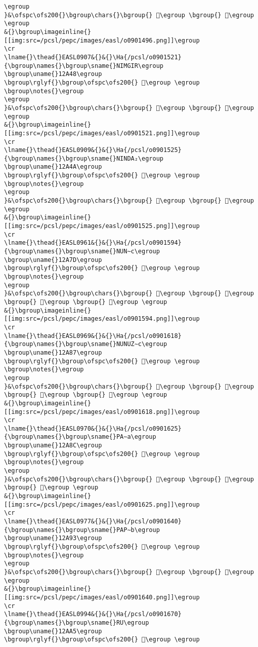\begin{verbatim}
\egroup
}&\ofspc\ofs200{}\bgroup\chars{}\bgroup{} 𒨷\egroup \bgroup{} 𒨹\egroup \egroup
&{}\bgroup\imageinline{}[[img:src=/pcsl/pepc/images/easl/o0901496.png]]\egroup
\cr
\lname{}\thead{}EASL0907&{}&{}\Ha{/pcsl/o0901521}{\bgroup\names{}\bgroup\sname{}NIMGIR\egroup
\bgroup\uname{}12A48\egroup
\bgroup\rglyf{}\bgroup\ofspc\ofs200{} 𒩈\egroup \egroup
\bgroup\notes{}\egroup
\egroup
}&\ofspc\ofs200{}\bgroup\chars{}\bgroup{} 𒩇\egroup \bgroup{} 𒩈\egroup \egroup
&{}\bgroup\imageinline{}[[img:src=/pcsl/pepc/images/easl/o0901521.png]]\egroup
\cr
\lname{}\thead{}EASL0909&{}&{}\Ha{/pcsl/o0901525}{\bgroup\names{}\bgroup\sname{}NINDA₂\egroup
\bgroup\uname{}12A4A\egroup
\bgroup\rglyf{}\bgroup\ofspc\ofs200{} 𒩊\egroup \egroup
\bgroup\notes{}\egroup
\egroup
}&\ofspc\ofs200{}\bgroup\chars{}\bgroup{} 𒩧\egroup \bgroup{} 𒩊\egroup \egroup
&{}\bgroup\imageinline{}[[img:src=/pcsl/pepc/images/easl/o0901525.png]]\egroup
\cr
\lname{}\thead{}EASL0961&{}&{}\Ha{/pcsl/o0901594}{\bgroup\names{}\bgroup\sname{}NUN∼c\egroup
\bgroup\uname{}12A7D\egroup
\bgroup\rglyf{}\bgroup\ofspc\ofs200{} 𒩽\egroup \egroup
\bgroup\notes{}\egroup
\egroup
}&\ofspc\ofs200{}\bgroup\chars{}\bgroup{} 𒩼\egroup \bgroup{} 𒩽\egroup \bgroup{} 𒩾\egroup \bgroup{} 𒩿\egroup \egroup
&{}\bgroup\imageinline{}[[img:src=/pcsl/pepc/images/easl/o0901594.png]]\egroup
\cr
\lname{}\thead{}EASL0969&{}&{}\Ha{/pcsl/o0901618}{\bgroup\names{}\bgroup\sname{}NUNUZ∼c\egroup
\bgroup\uname{}12A87\egroup
\bgroup\rglyf{}\bgroup\ofspc\ofs200{} 𒪇\egroup \egroup
\bgroup\notes{}\egroup
\egroup
}&\ofspc\ofs200{}\bgroup\chars{}\bgroup{} 𒪇\egroup \bgroup{} 𒪈\egroup \bgroup{} 𒪉\egroup \bgroup{} 𒪊\egroup \egroup
&{}\bgroup\imageinline{}[[img:src=/pcsl/pepc/images/easl/o0901618.png]]\egroup
\cr
\lname{}\thead{}EASL0970&{}&{}\Ha{/pcsl/o0901625}{\bgroup\names{}\bgroup\sname{}PA∼a\egroup
\bgroup\uname{}12A8C\egroup
\bgroup\rglyf{}\bgroup\ofspc\ofs200{} 𒪌\egroup \egroup
\bgroup\notes{}\egroup
\egroup
}&\ofspc\ofs200{}\bgroup\chars{}\bgroup{} 𒪋\egroup \bgroup{} 𒪌\egroup \bgroup{} 𒪍\egroup \egroup
&{}\bgroup\imageinline{}[[img:src=/pcsl/pepc/images/easl/o0901625.png]]\egroup
\cr
\lname{}\thead{}EASL0977&{}&{}\Ha{/pcsl/o0901640}{\bgroup\names{}\bgroup\sname{}PAP∼b\egroup
\bgroup\uname{}12A93\egroup
\bgroup\rglyf{}\bgroup\ofspc\ofs200{} 𒪓\egroup \egroup
\bgroup\notes{}\egroup
\egroup
}&\ofspc\ofs200{}\bgroup\chars{}\bgroup{} 𒪓\egroup \bgroup{} 𒪔\egroup \egroup
&{}\bgroup\imageinline{}[[img:src=/pcsl/pepc/images/easl/o0901640.png]]\egroup
\cr
\lname{}\thead{}EASL0994&{}&{}\Ha{/pcsl/o0901670}{\bgroup\names{}\bgroup\sname{}RU\egroup
\bgroup\uname{}12AA5\egroup
\bgroup\rglyf{}\bgroup\ofspc\ofs200{} 𒪥\egroup \egroup

\end{verbatim}

